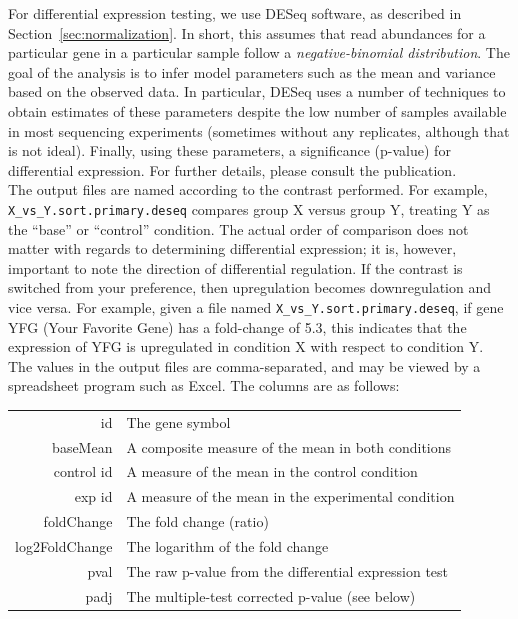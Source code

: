 \documentclass{article}
\begin{document}
For differential expression testing, we use DESeq software, as described in Section~\ref{sec:normalization}.  In short, this assumes that read abundances for a particular gene in a particular sample follow a \emph{negative-binomial distribution}.  The goal of the analysis is to infer model parameters such as the mean and variance based on the observed data.  In particular, DESeq uses a number of techniques to obtain estimates of these parameters despite the low number of samples available in most sequencing experiments (sometimes without any replicates, although that is not ideal).  Finally, using these parameters, a significance (p-value) for differential expression. For further details, please consult the publication.\\  

The output files are named according to the contrast performed.  For example, \verb|X_vs_Y.sort.primary.deseq| compares group X versus group Y, treating Y as the ``base'' or ``control'' condition.  The actual order of comparison does not matter with regards to determining differential expression; it is, however, important to note the direction of differential regulation.  If the contrast is switched from your preference, then upregulation becomes downregulation and vice versa.  For example, given a file named \verb|X_vs_Y.sort.primary.deseq|, if gene YFG (Your Favorite Gene) has a fold-change of 5.3, this indicates that the expression of YFG is upregulated in condition X with respect to condition Y.  \\

The values in the output files are comma-separated, and may be viewed by a spreadsheet program such as Excel.  The columns are as follows:
\begin{center}
\begin{tabular}{r|l}
id & The gene symbol \\
baseMean & A composite measure of the mean in both conditions  \\
\textlangle{}control id\textrangle{} & A measure of the mean in the control condition \\
\textlangle{}exp id\textrangle{} & A measure of the mean in the experimental condition \\
foldChange & The fold change (ratio)\\
log2FoldChange & The logarithm of the fold change \\
pval & The raw p-value from the differential expression test \\
padj & The multiple-test corrected p-value (see below)
\end{tabular}
\end{center}
\end{document}
